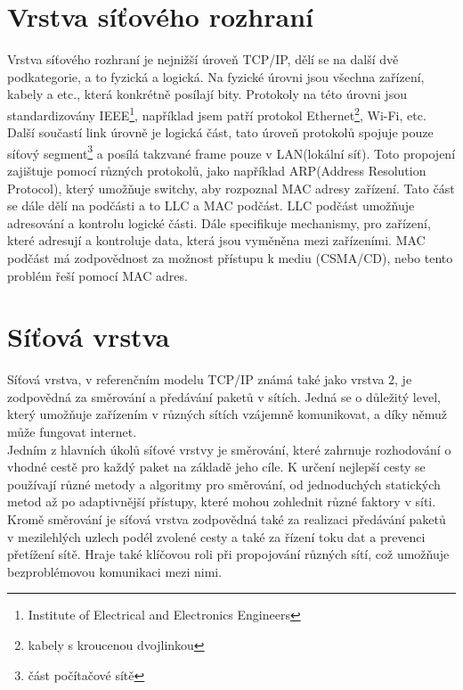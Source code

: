 \documentclass[12pt]{report}			%
\begin{document}
			\section{Vrstva síťového rozhraní}
			Vrstva síťového rozhraní je nejnižší úroveň TCP/IP, dělí se na další dvě podkategorie, a to fyzická a logická. Na fyzické úrovni jsou všechna zařízení, kabely a etc., která konkrétně posílají bity. Protokoly na této úrovni jsou standardizovány IEEE\footnote{Institute of Electrical and Electronics Engineers}, například jsem patří protokol Ethernet\footnote{kabely s kroucenou dvojlinkou}, Wi-Fi, etc.
 \\
Další součastí link úrovně je logická část, tato úroveň protokolů spojuje pouze síťový segment\footnote{část počítačové sítě} a posílá takzvané frame pouze v LAN(lokální síť). Toto propojení zajištuje pomocí různých protokolů, jako například ARP(Address Resolution Protocol), který umožňuje switchy, aby rozpoznal MAC adresy zařízení. Tato část se dále dělí na podčásti a to LLC a MAC podčást. LLC podčást umožňuje adresování a kontrolu logické části. Dále specifikuje mechanismy, pro zařízení, které adresují a kontroluje data, která jsou vyměněna mezi zařízeními. MAC podčást má zodpovědnost za možnost přístupu k mediu (CSMA/CD), nebo tento problém řeší pomocí MAC adres. 
\cite{Princip_5} \cite{Link_2} \cite{Link_3} \cite{Link_4} \cite{Link_5} \cite{Link_6}

			\section{Síťová vrstva}
Síťová vrstva, v referenčním modelu TCP/IP známá také jako vrstva 2, je zodpovědná za směrování a předávání paketů v sítích. Jedná se o důležitý level, který umožňuje zařízením v různých sítích vzájemně komunikovat, a díky němuž může fungovat internet.
\\
Jedním z hlavních úkolů síťové vrstvy je směrování, které zahrnuje rozhodování o vhodné cestě pro každý paket na základě jeho cíle. K určení nejlepší cesty se používají různé metody a algoritmy pro směrování, od jednoduchých statických metod až po adaptivnější přístupy, které mohou zohlednit různé faktory v síti.
\\
Kromě směrování je síťová vrstva zodpovědná také za realizaci předávání paketů v mezilehlých uzlech podél zvolené cesty a také za řízení toku dat a prevenci přetížení sítě. Hraje také klíčovou roli při propojování různých sítí, což umožňuje bezproblémovou komunikaci mezi nimi.
\cite{sit_1} \cite{sit_2}
\end{document}
